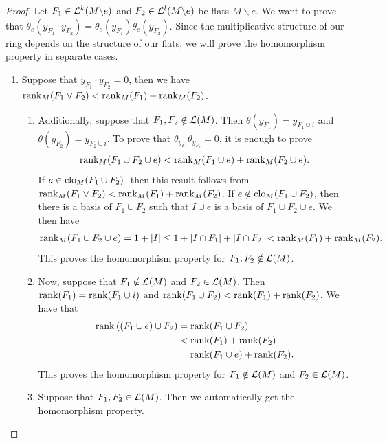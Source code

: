\documentclass{puthesis-UG}
\begin{document}
\begin{proof}
	Let $F_1 \in \mathcal{L}^k(M \backslash e)$ and $F_2 \in \mathcal{L}^l(M \backslash e)$ be flats $M \backslash e$. We want to prove that $\theta_e (y_{F_1} \cdot y_{F_2}) = \theta_e(y_{F_1}) \theta_e(y_{F_2})$. Since the multiplicative structure of our ring depends on the structure of our flats, we will prove the homomorphism property in separate cases. 
	\begin{enumerate}[label = (\alph*)]
		\item Suppose that $y_{F_1} \cdot y_{F_2} = 0$, then we have $\operatorname{rank}_M(F_1 \vee F_2) < \operatorname{rank}_M(F_1) + \operatorname{rank}_M(F_2)$.
		\begin{enumerate}[label = (\roman*)]
			\item Additionally, suppose that $F_1, F_2 \notin \mathcal{L}(M)$. Then $\theta (y_{F_1}) = y_{F_1 \cup i}$ and $\theta(y_{F_2}) = y_{F_2 \cup i}$. To prove that $\theta_{y_{F_1}} \theta_{y_{F_2}} = 0$, it is enough to prove 
			\[
				\operatorname{rank}_M(F_1 \cup F_2 \cup e) < \operatorname{rank}_M(F_1 \cup e) + \operatorname{rank}_M(F_2 \cup e).
			\]
			If $e \in \operatorname{clo}_M(F_1 \cup F_2)$, then this result follows from $\operatorname{rank}_M(F_1 \vee F_2) < \operatorname{rank}_M(F_1) + \operatorname{rank}_M(F_2)$. If $e \notin \operatorname{clo}_M(F_1 \cup F_2)$, then there is a basis of $F_1 \cup F_2$ such that $I \cup e$ is a basis of $F_1 \cup F_2 \cup e$. We then have 
			\begin{align*}
				\operatorname{rank}_M(F_1 \cup F_2 \cup e) = 1 + |I| \leq 1 + |I \cap F_1| + |I \cap F_2| < \operatorname{rank}_M(F_1) + \operatorname{rank}_M(F_2).
			\end{align*}
			This proves the homomorphism property for $F_1, F_2 \notin \mathcal{L}(M)$.

			\item Now, suppose that $F_1 \notin \mathcal{L}(M)$ and $F_2 \in \mathcal{L}(M)$. Then $\operatorname{rank} (F_1) = \operatorname{rank} (F_1 \cup i)$ and $\operatorname{rank} (F_1 \cup F_2) < \operatorname{rank} (F_1) + \operatorname{rank} (F_2)$. We have that 
			\begin{align*}
				\operatorname{rank} \left((F_1 \cup e) \cup F_2\right) & = \operatorname{rank} (F_1 \cup F_2) \\
				& < \operatorname{rank} (F_1) + \operatorname{rank} (F_2) \\
				& = \operatorname{rank} (F_1 \cup e) + \operatorname{rank} (F_2). 
			\end{align*}
			This proves the homomorphism property for $F_1 \notin \mathcal{L}(M)$ and $F_2 \in \mathcal{L}(M)$. 

			\item Suppose that $F_1, F_2 \in \mathcal{L}(M)$. Then we automatically get the homomorphism property. 
		\end{enumerate}


\end{enumerate}
\end{proof}
\end{document}
